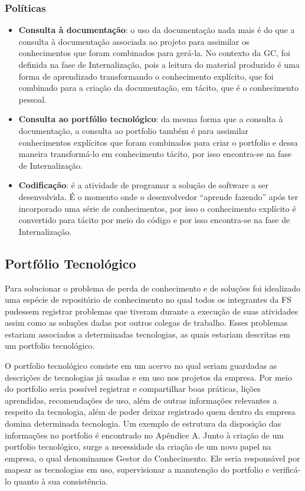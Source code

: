 \subsubsection{Políticas}
\begin{itemize}
\item \textbf{Consulta à documentação}: o uso da documentação nada mais é do que a consulta à documentação associada ao projeto para assimilar os conhecimentos que foram combinados para gerá-la. No contexto da GC, foi definida na fase de Internalização, pois a leitura do material produzido é uma forma de aprendizado transformando o conhecimento explícito, que foi combinado para a criação da documentação, em tácito, que é o conhecimento pessoal.
\item \textbf{Consulta ao portfólio tecnológico}: da mesma forma que a consulta à documentação, a consulta ao portfolio também é para assimilar conhecimentos explícitos que foram combinados para criar o portfolio e dessa maneira transformá-lo em conhecimento tácito, por isso encontra-se na fase de Internalização.
\item \textbf{Codificação}: é a atividade de programar a solução de software a ser desenvolvida. É o momento onde o desenvolvedor “aprende fazendo” após ter incorporado uma série de conhecimentos, por isso o conhecimento explícito é convertido para tácito por meio do código e por isso encontra-se na fase de Internalização.
\end{itemize}

\subsection{Portfólio Tecnológico}
Para solucionar o problema de perda de conhecimento e de soluções foi idealizado uma espécie de repositório de conhecimento no qual todos os integrantes da FS pudessem registrar problemas que tiveram durante a execução de suas atividades assim como as soluções dadas por outros colegas de trabalho. Esses problemas estariam associados a determinadas tecnologias, as quais estariam descritas em um portfolio tecnológico.

O portfolio tecnológico consiste em um acervo no qual seriam guardadas as descrições de tecnologias já usadas e em uso nos projetos da empresa. Por meio do portfolio seria possível registrar e compartilhar boas práticas, lições aprendidas, recomendações de uso, além de outras informações relevantes a respeito da tecnologia, além de poder deixar registrado quem dentro da empresa domina determinada tecnologia. Um exemplo de estrutura da disposição das informações no portfolio é encontrado no Apêndice A. Junto à criação de um portfolio tecnológico, surge a necessidade da criação de um novo papel na empresa, o qual denominamos Gestor do Conhecimento. Ele seria responsável por mapear as tecnologias em uso, supervisionar a manutenção do portfolio e verificá-lo quanto à sua consistência.


